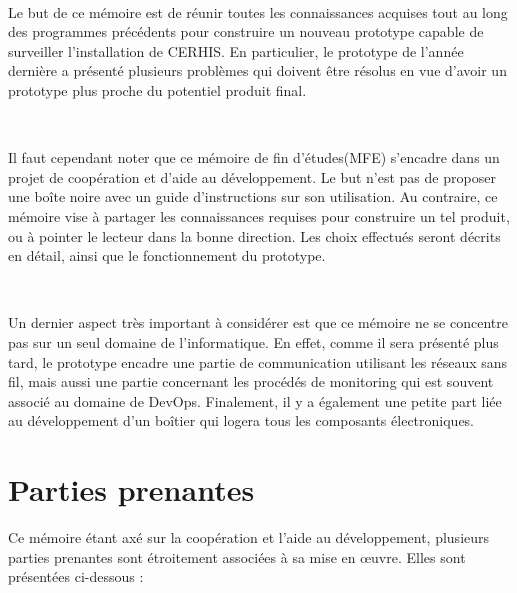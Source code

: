 ~

\noindent
Le but de ce mémoire est de réunir toutes les connaissances acquises tout au long des programmes précédents pour construire un nouveau prototype capable de surveiller l'installation de CERHIS.  En particulier, le prototype de l'année dernière a présenté plusieurs problèmes qui doivent être résolus en vue d'avoir un prototype plus proche du potentiel produit final.

~

\noindent
Il faut cependant noter que ce mémoire de fin d'études(MFE) s'encadre dans un projet de coopération et d'aide au développement. Le but n'est pas de proposer une boîte noire avec un guide d'instructions sur son utilisation. Au contraire, ce mémoire vise à partager les connaissances requises pour construire un tel produit, ou à pointer le lecteur dans la bonne direction. Les choix effectués seront décrits en détail, ainsi que le fonctionnement du prototype.

~

\noindent
Un dernier aspect très important à considérer est que ce mémoire ne se concentre pas sur un seul domaine de l'informatique. En effet, comme il sera présenté plus tard, le prototype encadre une partie de communication utilisant les réseaux sans fil, mais aussi une partie concernant les procédés de monitoring qui est souvent associé au domaine de DevOps. Finalement, il y a également une petite part liée au développement d'un boîtier qui logera tous les composants électroniques.


\section{Parties prenantes}

\noindent
Ce mémoire étant axé sur la coopération et l'aide au développement, plusieurs parties prenantes sont étroitement associées à sa mise en œuvre. Elles sont présentées ci-dessous :

~

